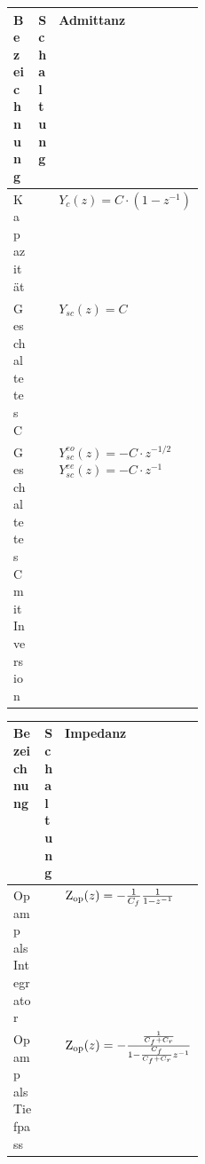 \begin{tabularx}{\linewidth}{p{0.25\linewidth}XX}
	\textbf{Bezeichnung} & \textbf{Schaltung} & \textbf{Admittanz} \\ \hline
	Kapazität &  & $Y_{c}(z) = C \cdot (1-z^{-1})$ \\
	Geschaltetes C &  & $Y_{sc}(z) = C$ \\
	Geschaltetes C mit Inversion &  & $Y_{sc}^{eo}(z) = -C \cdot z^{-1/2}$ \newline $Y_{sc}^{ee}(z) = -C \cdot z^{-1}$ \\
	\hline
\end{tabularx}

\begin{tabularx}{\linewidth}{p{0.25\linewidth}XX}
	\textbf{Bezeichnung} & \textbf{Schaltung} & \textbf{Impedanz} \\ \hline
	Opamp als Integrator &  & $\operatorname{Z_{\text{op}}}(z) = - \frac{1}{C_f} \frac{1}{1-z^{-1}}$ \\
	Opamp als Tiefpass & & $\operatorname{Z_{\text{op}}}(z) = - \frac{\frac{1}{C_f + C_r}}{1-\frac{C_f}{C_f+C_r}z^{-1}}$ \\
	\hline

\end{tabularx}